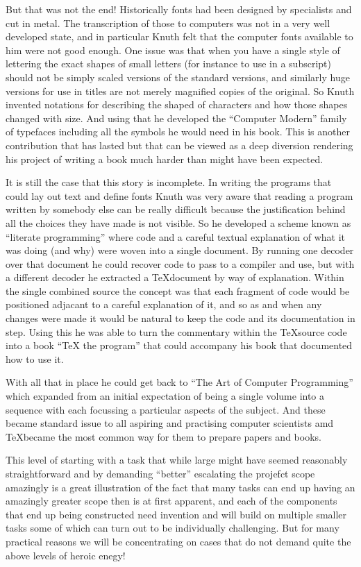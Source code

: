 But that was not the end! Historically fonts had been designed by specialists
and cut in metal. The transcription of those to computers was not in
a very well developed state, and in particular Knuth felt that the computer
fonts available to him were not good enough. One issue was that when you have
a single style of lettering the exact shapes of small letters (for instance
to use in a subscript) should not be simply scaled versions of the standard
versions, and similarly huge versions for use in titles are not merely
magnified copies of the original. So Knuth invented notations for describing
the shaped of characters and how those shapes changed with size. And using
that he developed the ``Computer Modern'' family of typefaces including all
the symbols he would need in his book. This is another contribution that
has lasted but that can be viewed as a deep diversion rendering his project
of writing a book much harder than might have been expected.

It is still the case that this story is incomplete. In writing the programs
that could lay out text and define fonts Knuth was very aware that reading
a program written by somebody else can be really difficult because the
justification behind all the choices they have made is not visible. So
he developed a scheme known as ``literate programming'' where code and
a careful textual explanation of what it was doing (and why) were woven
into a single document. By running one decoder over that document he could
recover code to pass to a compiler and use, but with a different decoder
he extracted a \TeX document by way of explanation. Within the single
combined source the concept was that each fragment of code would be
positioned adjacant to a careful explanation of it, and so as and when
any changes were made it would be natural to keep the code and its
documentation in step. Using this he was able to turn the commentary
within the \TeX source code into a book ``TeX the program'' that could
accompany his book that documented how to use it.

With all that in place he could get back to ``The Art of Computer Programming''
which expanded from an initial expectation of being a single volume
into a sequence with each focussing a particular aspects of the subject. And
these became standard issue to all aspiring and practising computer scientists
amd \TeX became the most common way for them to prepare papers and books.

This level of starting with a task that while large might have seemed
reasonably straightforward and by demanding ``better'' escalating the
projefct scope amazingly is a great illustration of the fact that many
tasks can end up having an amazingly greater scope then is at first
apparent, and each of the components that end up being constructed need
invention and will build on multiple smaller tasks some of which
can turn out to be individually challenging.
But for many practical reasons we will be concentrating
on cases that do not demand quite the above levels of heroic enegy!
